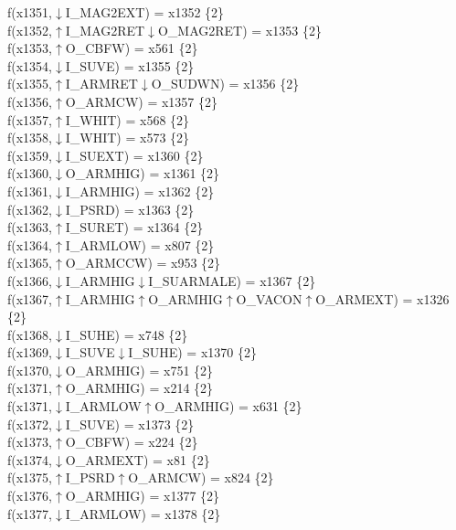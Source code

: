 f(x1351,$\downarrow$I\_MAG2EXT) = x1352 \{2\} \\  
f(x1352,$\uparrow$I\_MAG2RET$\downarrow$O\_MAG2RET) = x1353 \{2\} \\  
f(x1353,$\uparrow$O\_CBFW) = x561 \{2\} \\  
f(x1354,$\downarrow$I\_SUVE) = x1355 \{2\} \\  
f(x1355,$\uparrow$I\_ARMRET$\downarrow$O\_SUDWN) = x1356 \{2\} \\  
f(x1356,$\uparrow$O\_ARMCW) = x1357 \{2\} \\  
f(x1357,$\uparrow$I\_WHIT) = x568 \{2\} \\  
f(x1358,$\downarrow$I\_WHIT) = x573 \{2\} \\  
f(x1359,$\downarrow$I\_SUEXT) = x1360 \{2\} \\  
f(x1360,$\downarrow$O\_ARMHIG) = x1361 \{2\} \\  
f(x1361,$\downarrow$I\_ARMHIG) = x1362 \{2\} \\  
f(x1362,$\downarrow$I\_PSRD) = x1363 \{2\} \\  
f(x1363,$\uparrow$I\_SURET) = x1364 \{2\} \\  
f(x1364,$\uparrow$I\_ARMLOW) = x807 \{2\} \\  
f(x1365,$\uparrow$O\_ARMCCW) = x953 \{2\} \\  
f(x1366,$\downarrow$I\_ARMHIG$\downarrow$I\_SUARMALE) = x1367 \{2\} \\  
f(x1367,$\uparrow$I\_ARMHIG$\uparrow$O\_ARMHIG$\uparrow$O\_VACON$\uparrow$O\_ARMEXT) = x1326 \{2\} \\  
f(x1368,$\downarrow$I\_SUHE) = x748 \{2\} \\  
f(x1369,$\downarrow$I\_SUVE$\downarrow$I\_SUHE) = x1370 \{2\} \\  
f(x1370,$\downarrow$O\_ARMHIG) = x751 \{2\} \\  
f(x1371,$\uparrow$O\_ARMHIG) = x214 \{2\} \\  
f(x1371,$\downarrow$I\_ARMLOW$\uparrow$O\_ARMHIG) = x631 \{2\} \\  
f(x1372,$\downarrow$I\_SUVE) = x1373 \{2\} \\  
f(x1373,$\uparrow$O\_CBFW) = x224 \{2\} \\  
f(x1374,$\downarrow$O\_ARMEXT) = x81 \{2\} \\  
f(x1375,$\uparrow$I\_PSRD$\uparrow$O\_ARMCW) = x824 \{2\} \\  
f(x1376,$\uparrow$O\_ARMHIG) = x1377 \{2\} \\  
f(x1377,$\downarrow$I\_ARMLOW) = x1378 \{2\} \\  
